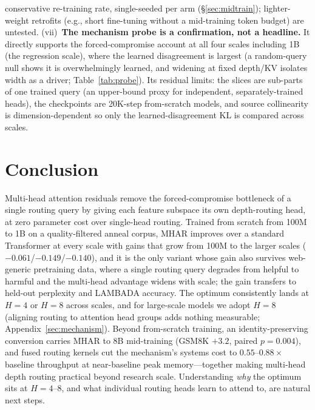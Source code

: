 \documentclass{article}
\begin{document}
conservative re-training rate, single-seeded per arm (\S\ref{sec:midtrain});
lighter-weight retrofits (e.g., short fine-tuning without a mid-training token
budget) are untested. (vii)~\textbf{The mechanism
probe is a confirmation, not a headline.} It directly supports the
forced-compromise account at all four scales including 1B (the regression
scale), where the learned disagreement is largest (a random-query null shows it is
overwhelmingly learned, and widening at fixed depth/KV isolates width as a driver;
Table~\ref{tab:probe}). Its residual limits: the slices are sub-parts of one trained
query (an upper-bound proxy for independent, separately-trained heads), the
checkpoints are 20K-step from-scratch models, and source collinearity is
dimension-dependent so only the learned-disagreement KL is compared across scales.

\fi

\section{Conclusion}
Multi-head attention residuals remove the forced-compromise bottleneck of a single
routing query by giving each feature subspace its own depth-routing head, at zero
parameter cost over single-head routing. Trained from scratch from 100M to 1B on a
quality-filtered anneal corpus, MHAR improves over a standard Transformer at every
scale with gains that grow from 100M to the larger scales
($-0.061$/$-0.149$/$-0.140$), and it is the
only variant whose gain also survives web-generic pretraining data, where a single
routing query degrades from helpful to harmful and the multi-head advantage
widens with scale; the gain transfers to held-out perplexity and LAMBADA
accuracy. The optimum
consistently lands at $H{=}4$ or $H{=}8$ across scales, and for large-scale
models we adopt $H{=}8$ (aligning routing to attention head groups adds nothing
measurable; Appendix~\ref{sec:mechanism}). Beyond from-scratch training, an
identity-preserving conversion carries MHAR to 8B mid-training (GSM8K $+3.2$,
paired $p{=}0.004$), and fused routing
kernels cut the mechanism's systems cost to $0.55$--$0.88\times$ baseline throughput
at near-baseline peak memory---together making multi-head depth routing practical
beyond research scale. Understanding \emph{why} the optimum sits at $H{=}4$--$8$, and
what individual routing heads learn to attend to, are natural next steps.

\iffalse
\end{document}
